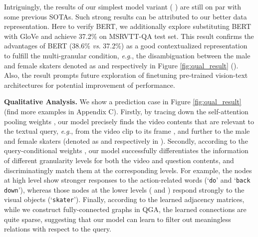 \documentclass[letterpaper]{article} \usepackage{aaai21}  \usepackage{times}  \usepackage{helvet} \usepackage{courier}  \usepackage[hyphens]{url}  \usepackage{graphicx} \urlstyle{rm} \def\UrlFont{\rm}  \usepackage{natbib}  \usepackage{caption} \usepackage{color, colortbl}
\newcommand{\vs}{\textit{vs}. }
\newcommand{\eg}{\textit{e}.\textit{g}.}
\begin{document}
Intriguingly, the results of our simplest model variant ( ) are still on par with some previous SOTAs. Such strong results can be attributed to our better data representation. Here to verify BERT, we additionally explore substituting BERT with GloVe \cite{pennington2014glove} and achieve 37.2\% on MSRVTT-QA test set. This result confirms the advantages of BERT (38.6\% \vs 37.2\%) as a good contextualized representation to fulfill the multi-granular condition, \eg, the disambiguation between the male and female skaters denoted as  and  respectively in Figure  \ref{fig:qual_result} (). Also, the result prompts future exploration of finetuning pre-trained vision-text architectures \cite{lei2021less} for potential improvement of performance.

\setlength{\tabcolsep}{2.6pt}
\begin{table}[t!]
\small
\centering
\begin{threeparttable}
\caption{Test accuracy per question type. Roughly  () of the `what' questions in MSRVTT-QA (MSVD-QA) ask actions/activities; others are about objects/attributes. We distinguish them via the pattern `what ... doing' in questions.}
\label{table:detailres}
\end{threeparttable}
\vspace{-1em} 
\end{table}

\textbf{Qualitative Analysis.}
We show a prediction case in Figure \ref{fig:qual_result} (find more examples in Appendix C). Firstly, by tracing down the self-attention pooling weights , our model precisely finds the video contents that are relevant to the textual query, \eg, from the  video clip  to its  frame , and further to the male and female skaters (denoted as  and  respectively in ). Secondly, according to the query-conditional weights , our model successfully differentiates the information of different granularity levels for both the video and question contents, and discriminatingly match them at the corresponding levels. For example, the nodes at high level  show stronger responses to the action-related words (`\texttt{do}' and `\texttt{back down}'), whereas those nodes at the lower levels ( and ) respond strongly to the visual objects (`\texttt{skater}'). Finally, according to the learned adjacency matrices,  while we construct fully-connected graphs in QGA, the learned connections are quite sparse, suggesting that our model can learn to filter out meaningless relations with respect to the query. 
\end{document}
